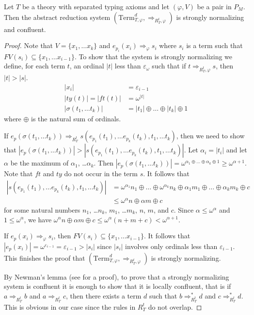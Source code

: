 \documentclass[reqno]{amsart}
\theoremstyle{definition}
\theoremstyle{remark}
\newcommand{\Term}{\mathrm{Term}}
\newcommand{\ft}{\mathit{ft}}
\newcommand{\ty}{\mathit{ty}}
\numberwithin{figure}{section}
\begin{document}
\begin{lem}
Let $T$ be a theory with separated typing axioms and let $(\varphi,V)$ be a pair in $P_M$.
Then the abstract reduction system $(\Term_{T,\varphi}^d,\Rightarrow_{R^t_T,\varphi})$ is strongly normalizing and confluent.
\end{lem}
\begin{proof}
Note that $V = \{ x_1, \ldots x_k \}$ and $e_{p_i}(x_i) \Rightarrow_\varphi s_i$ where $s_i$ is a term such that $FV(s_i) \subseteq \{ x_1, \ldots x_{i-1} \}$.
To show that the system is strongly normalizing we define, for each term $t$, an ordinal $|t|$ less than $\varepsilon_\omega$ such that if $t \Rightarrow_{R^t_T,\varphi} s$, then $|t| > |s|$.
\begin{align*}
|x_i| & = \varepsilon_{i-1} \\
|\ty(t)| = |\ft(t)| & = \omega^{|t|}\\
|\sigma(t_1, \ldots t_k)| & = |t_1| \oplus \ldots \oplus |t_k| \oplus 1
\end{align*}
where $\oplus$ is the natural sum of ordinals.

If $e_p(\sigma(t_1, \ldots t_k)) \Rightarrow_{R_T^t} s(e_{p_1}(t_1), \ldots e_{p_k}(t_k), t_1, \ldots t_k)$, then we need to show that $|e_p(\sigma(t_1, \ldots t_k))| > |s(e_{p_1}(t_1), \ldots e_{p_k}(t_k), t_1, \ldots t_k)|$.
Let $\alpha_i = |t_i|$ and let $\alpha$ be the maximum of $\alpha_1$, \ldots $\alpha_k$.
Then $|e_p(\sigma(t_1, \ldots t_k))| = \omega^{\alpha_1 \oplus \ldots \oplus \alpha_k \oplus 1} \geq \omega^{\alpha + 1}$.
Note that $\ft$ and $\ty$ do not occur in the term $s$.
It follows that
\begin{align*}
|s(e_{p_1}(t_1), \ldots e_{p_k}(t_k), t_1, \ldots t_k)| & = \omega^{\alpha_1} n_1 \oplus \ldots \oplus \omega^{\alpha_k} n_k \oplus \alpha_1 m_1 \oplus \ldots \oplus \alpha_k m_k \oplus c \\
                                                        & \leq \omega^\alpha n \oplus \alpha m \oplus c
\end{align*}
for some natural numbers $n_1$, \ldots $n_k$, $m_1$, \ldots $m_k$, $n$, $m$, and $c$.
Since $\alpha \leq \omega^\alpha$ and $1 \leq \omega^\alpha$, we have $\omega^\alpha n \oplus \alpha m \oplus c \leq \omega^\alpha (n + m + c) < \omega^{\alpha + 1}$.

If $e_p(x_i) \Rightarrow_\varphi s_i$, then $FV(s_i) \subseteq \{ x_1, \ldots x_{i-1} \}$.
It follows that $|e_p(x_i)| = \omega^{\varepsilon_{i-1}} = \varepsilon_{i-1} > |s_i|$ since $|s_i|$ involves only ordinals less than $\varepsilon_{i-1}$.
This finishes the proof that $(\Term_{T,\varphi}^d,\Rightarrow_{R^t_T,\varphi})$ is strongly normalizing.

By Newman's lemma (see \cite[Lemma~2.2.5]{ohlebusch-advanced} for a proof), to prove that a strongly normalizing system is confluent it is enough to show that it is locally confluent,
that is if $a \Rightarrow_{R^t_T} b$ and $a \Rightarrow_{R^t_T} c$, then there exists a term $d$ such that $b \Rightarrow_{R^t_T}^* d$ and $c \Rightarrow_{R^t_T}^* d$.
This is obvious in our case since the rules in $R^t_T$ do not overlap.
\end{proof}
\end{document}
